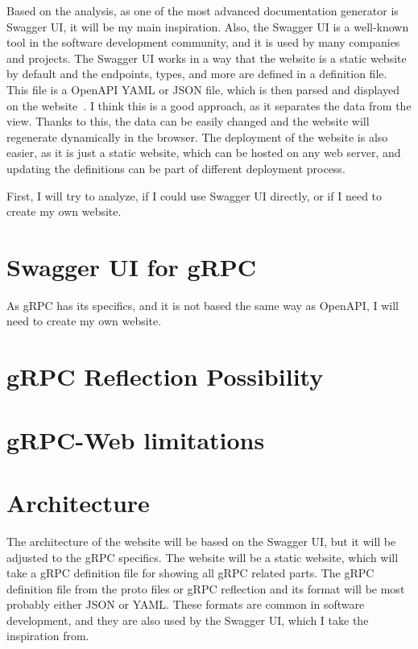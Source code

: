 Based on the analysis, as one of the most advanced documentation generator is Swagger UI, it will be my main inspiration.
Also, the Swagger UI is a well-known tool in the software development community, and it is used by many companies and projects.
The Swagger UI works in a way that the website is a static website by default and the endpoints, types, and more are defined in a definition file.
This file is a OpenAPI YAML or JSON file, which is then parsed and displayed on the website~\cite{swagger-ui-definition-file}.
I think this is a good approach, as it separates the data from the view.
Thanks to this, the data can be easily changed and the website will regenerate dynamically in the browser.
The deployment of the website is also easier, as it is just a static website, which can be hosted on any web server, and updating the definitions can be part of different deployment process.

First, I will try to analyze, if I could use Swagger UI directly, or if I need to create my own website.


\section{Swagger UI for gRPC}



As gRPC has its specifics, and it is not based the same way as OpenAPI, I will need to create my own website.


\section{gRPC Reflection Possibility}


\section{gRPC-Web limitations}


\section{Architecture}
The architecture of the website will be based on the Swagger UI, but it will be adjusted to the gRPC specifics.
The website will be a static website, which will take a gRPC definition file for showing all gRPC related parts.
The gRPC definition file from the proto files or gRPC reflection and its format will be most probably either JSON or YAML\@.
These formats are common in software development, and they are also used by the Swagger UI, which I take the inspiration from.

